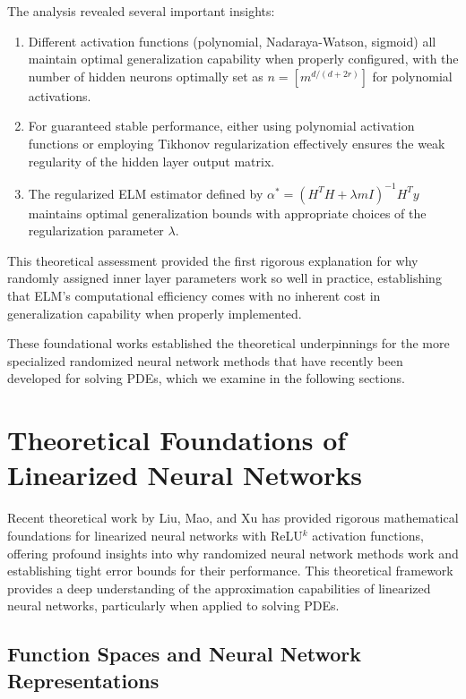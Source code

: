 \documentclass[11pt]{article}
\begin{document}
The analysis revealed several important insights:

\begin{enumerate}
    \item Different activation functions (polynomial, Nadaraya-Watson, sigmoid) all maintain optimal generalization capability when properly configured, with the number of hidden neurons optimally set as $n = [m^{d/(d+2r)}]$ for polynomial activations.
    
    \item For guaranteed stable performance, either using polynomial activation functions or employing Tikhonov regularization effectively ensures the weak regularity of the hidden layer output matrix.
    
    \item The regularized ELM estimator defined by $\alpha^* = (H^T H + \lambda m I)^{-1} H^T y$ maintains optimal generalization bounds with appropriate choices of the regularization parameter $\lambda$.
\end{enumerate}

This theoretical assessment provided the first rigorous explanation for why randomly assigned inner layer parameters work so well in practice, establishing that ELM's computational efficiency comes with no inherent cost in generalization capability when properly implemented.

These foundational works established the theoretical underpinnings for the more specialized randomized neural network methods that have recently been developed for solving PDEs, which we examine in the following sections.

\section{Theoretical Foundations of Linearized Neural Networks}

Recent theoretical work by Liu, Mao, and Xu \citep{LiuMaoXu2025} has provided rigorous mathematical foundations for linearized neural networks with ReLU$^k$ activation functions, offering profound insights into why randomized neural network methods work and establishing tight error bounds for their performance. This theoretical framework provides a deep understanding of the approximation capabilities of linearized neural networks, particularly when applied to solving PDEs.

\subsection{Function Spaces and Neural Network Representations}
\end{document}
